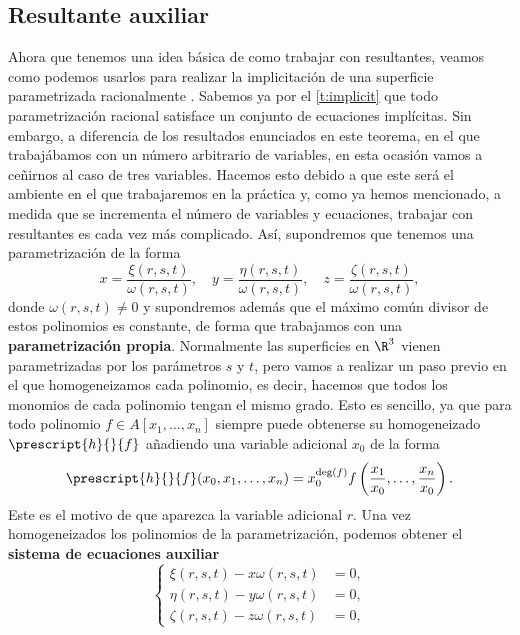 \subsection{Resultante auxiliar}
Ahora que tenemos una idea básica de como trabajar con resultantes, veamos como podemos usarlos para realizar la implicitación de una superficie parametrizada racionalmente \cite{res1}. Sabemos ya por el \autoref{t:implicit} que todo parametrización racional satisface un conjunto de ecuaciones implícitas. Sin embargo, a diferencia de los resultados enunciados en este teorema, en el que trabajábamos con un número arbitrario de variables, en esta ocasión vamos a ceñirnos al caso de tres variables. Hacemos esto debido a que este será el ambiente en el que trabajaremos en la práctica y, como ya hemos mencionado, a medida que se incrementa el número de variables y ecuaciones, trabajar con resultantes es cada vez más complicado. Así, supondremos que tenemos una parametrización de la forma
\begin{equation}\label{eq:param}
    x = \frac{\xi(r,s,t)}{\omega(r,s,t)},\quad y= \frac{\eta(r,s,t)}{\omega(r,s,t)},\quad  z= \frac{\zeta(r,s,t)}{\omega(r,s,t)},
\end{equation}
donde $\omega(r,s,t)\neq 0$ y supondremos además que el máximo común divisor de estos polinomios es constante, de forma que trabajamos con una \textbf{parametrización propia}. Normalmente las superficies en $\R^3$ vienen parametrizadas por los parámetros $s$ y $t$, pero vamos a realizar un paso previo en el que homogeneizamos cada polinomio, es decir, hacemos que todos los monomios de cada polinomio tengan el mismo grado. Esto es sencillo, ya que para todo polinomio $f\in A[x_1,\dots, x_n]$ siempre puede obtenerse su homogeneizado $\prescript{h}{}{f}$ añadiendo una variable adicional $x_0$ \cite{wiki-homog} de la forma
\begin{equation*}
    \prescript{h}{}{f}(x_0,x_1,\dots, x_n) = x_0^{\deg(f)}f\left(\frac{x_1}{x_0},\dots, \frac{x_n}{x_0}  \right).
\end{equation*}
Este es el motivo de que aparezca la variable adicional $r$. Una vez homogeneizados los polinomios de la parametrización, podemos obtener el \textbf{sistema de ecuaciones auxiliar}
\begin{equation}\label{eq:aux}
    \begin{cases}
        \xi(r,s,t)-x\omega(r,s,t) &= 0,\\
         \eta(r,s,t)-y\omega(r,s,t) &= 0,\\
          \zeta(r,s,t)-z\omega(r,s,t) &= 0,
    \end{cases}
\end{equation}
